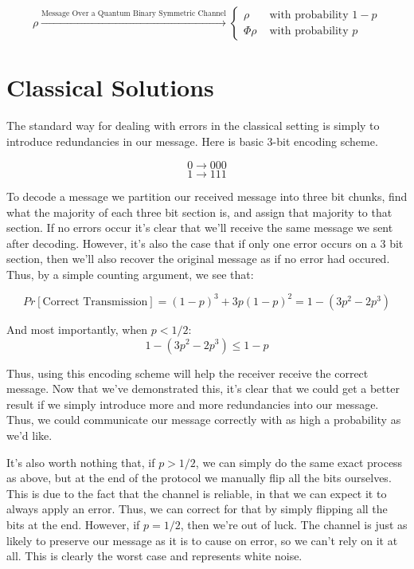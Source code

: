 \documentclass[11pt]{article}
\begin{document}
\abovedisplayskip=0pt\relax
\[
\rho \xrightarrow{\text{Message Over a Quantum Binary Symmetric Channel}}
\begin{cases}
\rho & \text{ with probability } 1-p\\       
\Phi\rho  & \text{ with probability  } p            
\end{cases}
\]

\section{Classical Solutions}

The standard way for dealing with errors in the classical setting is simply to introduce redundancies in our message. Here is basic 3-bit encoding scheme. 

{
\[0 \xrightarrow{} 000\]
\[1 \xrightarrow{} 111\]
}

To decode a message we partition our received message into three bit chunks, find what the majority of each three bit section is, and assign that majority to that section. If no errors occur it's clear that we'll receive the same message we sent after decoding. However, it's also the case that if only one error occurs on a 3 bit section, then we'll also recover the original message as if no error had occured. Thus, by a simple counting argument, we see that:

{
\[
Pr[\text{Correct Transmission}] = (1-p)^3 + 3p(1-p)^2 = 1-(3p^2 -2p^3)
\]
}

And most importantly, when $p < 1/2$:
{
\[
1-(3p^2 -2p^3) \leq 1 -p 
\]
}

Thus, using this encoding scheme will help the receiver receive the correct message. Now that we've demonstrated this, it's clear that we could get a better result if we simply introduce more and more redundancies into our message. Thus, we could communicate our message correctly with as high a probability as we'd like. 

It's also worth nothing that, if $p>1/2$, we can simply do the same exact process as above, but at the end of the protocol we manually flip all the bits ourselves. This is due to the fact that the channel is reliable, in that we can expect it to always apply an error. Thus, we can correct for that by simply flipping all the bits at the end. However, if $p = 1/2$, then we're out of luck. The channel is just as likely to preserve our message as it is to cause on error, so we can't rely on it at all. This is clearly the worst case and represents white noise. 
\end{document}
